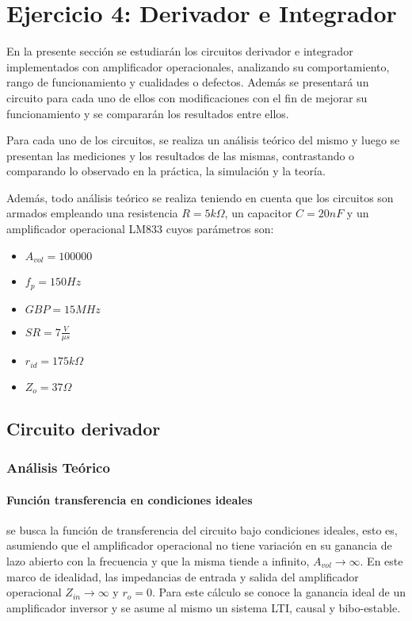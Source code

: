 


\section{Ejercicio 4: Derivador e Integrador}
En la presente secci\'on se estudiar\'an los circuitos derivador e integrador implementados con amplificador operacionales, analizando su comportamiento, rango de funcionamiento y cualidades o defectos. Adem\'as se presentar\'a un circuito para cada uno de ellos con modificaciones con el fin de mejorar su funcionamiento y se comparar\'an los resultados entre ellos.

Para cada uno de los circuitos, se realiza un an\'alisis te\'orico del mismo y luego se presentan las mediciones y los resultados de las mismas, contrastando o comparando lo observado en la pr\'actica, la simulaci\'on y la teor\'ia.

Adem\'as, todo an\'alisis te\'orico se realiza teniendo en cuenta que los circuitos son armados empleando una resistencia $R = 5k \Omega$, un capacitor $C = 20nF$ y un amplificador operacional LM833 cuyos par\'ametros son:
\begin{itemize}
	\item $A_{vol} = 100000$
	\item $f_p = 150Hz$
	\item $GBP = 15MHz$
	\item $SR = 7 \frac{V}{\mu s}$
	\item $r_{id} = 175k \Omega$
	\item $Z_o = 37 \Omega$
\end{itemize}


	\subsection{Circuito derivador}
 
\subsubsection{An\'alisis Te\'orico}
	

\paragraph*{Funci\'on transferencia en condiciones ideales}se busca la funci\'on de transferencia del circuito bajo condiciones ideales, esto es, asumiendo que el amplificador operacional no tiene variaci\'on en su ganancia de lazo abierto con la frecuencia y que la misma tiende a infinito, $A_{vol} \to \infty$. En este marco de idealidad, las impedancias de entrada y salida del amplificador operacional $Z_{in} \to \infty$ y $r_o = 0$. Para este c\'alculo se conoce la ganancia ideal de un amplificador inversor y se asume al mismo un sistema LTI, causal y bibo-estable.

